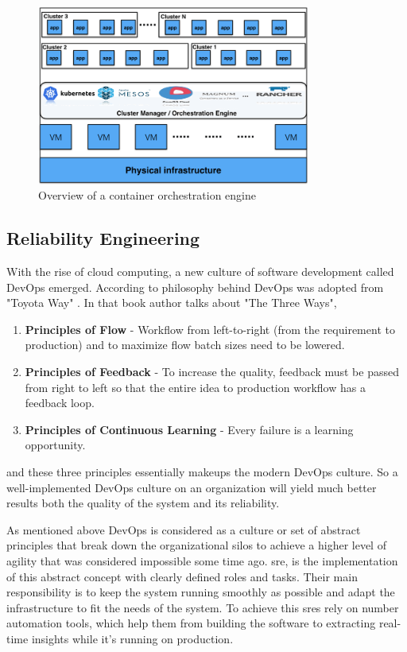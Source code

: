 \begin{figure}[H]
    \includegraphics[width=9cm]{assets/literature-review/Container-orchestration-engines.png}
    \caption{Overview of a container orchestration engine \citep{ElasticityCloudComputing}}
\end{figure}


\subsection{Reliability Engineering}

With the rise of cloud computing, a new culture of software development called DevOps emerged. According to \cite{kim2014phoenix} philosophy behind DevOps was adopted from "Toyota Way"  \citep{liker2006toyota}. In that book author talks about "The Three Ways",
\begin{enumerate}
\item \textbf{Principles of Flow} - Workflow from left-to-right (from the requirement to production) and to maximize flow batch sizes need to be lowered.
\item \textbf{Principles of Feedback} - To increase the quality, feedback must be passed from right to left so that the entire idea to production workflow has a feedback loop. 
\item \textbf{Principles of Continuous Learning} - Every failure is a learning opportunity.
\end{enumerate}
and these three principles essentially makeups the modern DevOps culture. So a well-implemented DevOps culture on an organization will yield much better results both the quality of the system and its reliability. 

As mentioned above DevOps is considered as a culture or set of abstract principles that break down the organizational silos to achieve a higher level of agility that was considered impossible some time ago. \ac{sre}, is the implementation of this abstract concept with clearly defined roles and tasks. Their main responsibility is to keep the system running smoothly as possible and adapt the infrastructure to fit the needs of the system. To achieve this \acp{sre} rely on number automation tools, which help them from building the software to extracting real-time insights while it's running on production.


